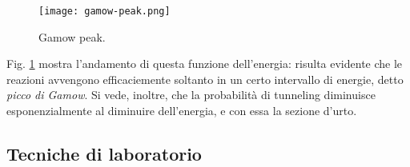 \begin{figure}
	\centering
	\texttt{[image: gamow-peak.png]}
	\caption{Gamow peak.}
	\label{gamow-peak}
\end{figure}

Fig. \ref{gamow-peak} mostra l'andamento di questa funzione dell'energia: risulta evidente che le reazioni avvengono efficaciemente soltanto in un certo intervallo di energie, detto \textit{picco di Gamow}. Si vede, inoltre, che la probabilità di tunneling diminuisce esponenzialmente al diminuire dell'energia, e con essa la sezione d'urto.

\subsection{Tecniche di laboratorio}

